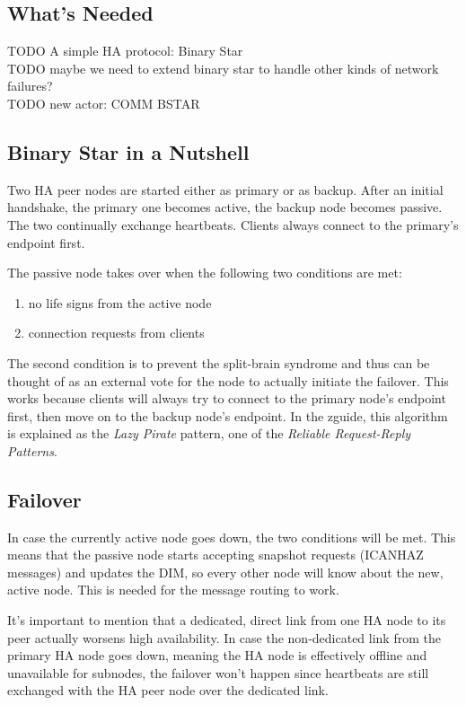 \subsection{What's Needed}
TODO A simple HA protocol: Binary Star\\
TODO maybe we need to extend binary star to handle other kinds of network failures?\\
TODO new actor: COMM BSTAR\\

\subsection{Binary Star in a Nutshell}
Two HA peer nodes are started either as primary or as backup. After an initial
handshake, the primary one becomes active, the backup node becomes passive. The
two continually exchange heartbeats. Clients always connect to the primary's endpoint first.

The passive node takes over when the following two conditions are met:

\begin{enumerate}
\item no life signs from the active node
\item connection requests from clients
\end{enumerate}

The second condition is to prevent the split-brain syndrome and thus can be
thought of as an external vote for the node to actually initiate the failover.
This works because clients will always try to connect to the primary node's
endpoint first, then move on to the backup node's endpoint. In the
\gls{zguide}, this algorithm is explained as the \emph{Lazy Pirate} pattern,
one of the \emph{Reliable Request-Reply Patterns}.

\subsection{Failover}
In case the currently active node goes down, the two conditions will be met.
This means that the passive node starts accepting snapshot requests (ICANHAZ
messages) and updates the DIM, so every other node will know about the new,
active node. This is needed for the message routing to work.

It's important to mention that a dedicated, direct link from one HA node to its
peer actually worsens high availability. In case the non-dedicated link from
the primary HA node goes down, meaning the HA node is effectively offline and
unavailable for subnodes, the failover won't happen since heartbeats are still
exchanged with the HA peer node over the dedicated link.

